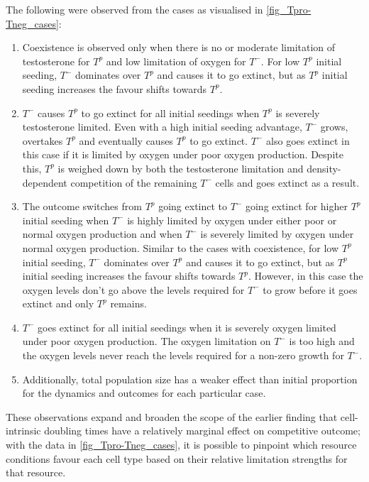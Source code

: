 The following were observed from the cases as visualised in \autoref{fig_Tpro-Tneg_cases}:
\begin{enumerate}
  \item Coexistence is observed only when there is no or moderate limitation of testosterone for $T^p$ and low limitation of oxygen for $T^-$. For low $T^p$ initial seeding, $T^-$ dominates over $T^p$ and causes it to go extinct, but as $T^p$ initial seeding increases the favour shifts towards $T^p$.
  \item $T^-$ causes $T^p$ to go extinct for all initial seedings when $T^p$ is severely testosterone limited. Even with a high initial seeding advantage, $T^-$ grows, overtakes $T^p$ and eventually causes $T^p$ to go extinct. $T^-$ also goes extinct in this case if it is limited by oxygen under poor oxygen production. Despite this, $T^p$ is weighed down by both the testosterone limitation and density-dependent competition of the remaining $T^-$ cells and goes extinct as a result.
  \item The outcome switches from $T^p$ going extinct to $T^-$ going extinct for higher $T^p$ initial seeding when $T^-$ is highly limited by oxygen under either poor or normal oxygen production and when $T^-$ is severely limited by oxygen under normal oxygen production. Similar to the cases with coexistence, for low $T^p$ initial seeding, $T^-$ dominates over $T^p$ and causes it to go extinct, but as $T^p$ initial seeding increases the favour shifts towards $T^p$. However, in this case the oxygen levels don’t go above the levels required for $T^-$ to grow before it goes extinct and only $T^p$ remains.
  \item $T^-$ goes extinct for all initial seedings when it is severely oxygen limited under poor oxygen production. The oxygen limitation on $T^-$ is too high and the oxygen levels never reach the levels required for a non-zero growth for $T^-$.
  \item Additionally, total population size has a weaker effect than initial proportion for the dynamics and outcomes for each particular case.
\end{enumerate}

These observations expand and broaden the scope of the earlier finding that cell-intrinsic doubling times have a relatively marginal effect on competitive outcome; with the data in \autoref{fig_Tpro-Tneg_cases}, it is possible to pinpoint which resource conditions favour each cell type based on their relative limitation strengths for that resource.

